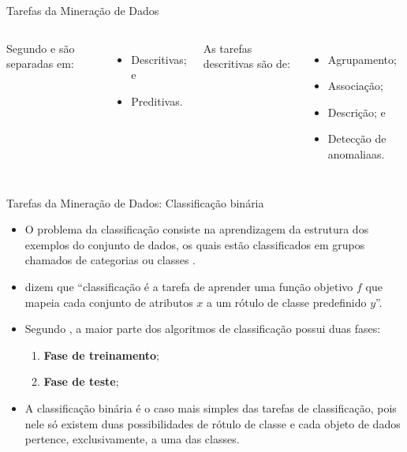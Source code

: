 \documentclass[%
  10pt,%
  aspectratio = 169,%
  compress,%
  t,%
]{beamer}%
\begin{document}
    
    \begin{frame}[fragile = singleslide]{}{Tarefas da Mineração de Dados}
        \begin{columns}[t]
        Segundo \cite[p.~7]{TanIDM2014} e \cite[p.~15]{Han:2011:DMC:1972541} são separadas em:
        \begin{itemize}
            \item Descritivas; e
            \item Preditivas.
        \end{itemize}
        
        As tarefas descritivas são de:
        \begin{itemize}
            \item Agrupamento;
            \item Associação;
            \item Descrição; e
            \item Detecção de anomaliaas.
        \end{itemize}
        
        
        \end{columns}
    \end{frame}
    
    \begin{frame}[fragile = singleslide]{}{Tarefas da Mineração de Dados: Classificação binária}
        \begin{itemize}
            \item O problema da classificação consiste na aprendizagem da estrutura dos exemplos do conjunto de dados, os quais estão classificados em grupos chamados de categorias ou classes \cite[p.~285]{Aggarwal_DMTT_2015}.
            
            \item \cite[p.~146, tradução nossa]{TanIDM2014} dizem que ``classificação é a tarefa de aprender uma função objetivo $f$ que mapeia cada conjunto de atributos $x$ a um rótulo de classe predefinido $y$''.
            
            \item Segundo \cite[p.~286]{Aggarwal_DMTT_2015}, a maior parte dos algoritmos de classificação possui duas fases:
            \begin{enumerate}
                \item \textbf{Fase de treinamento};
                \item \textbf{Fase de teste};
            \end{enumerate}
            
            \item A classificação binária é o caso mais simples das tarefas de classificação, pois nele só existem duas possibilidades de rótulo de classe e cada objeto de dados pertence, exclusivamente, a uma das classes.
        \end{itemize}
    \end{frame}
    
\end{document}
